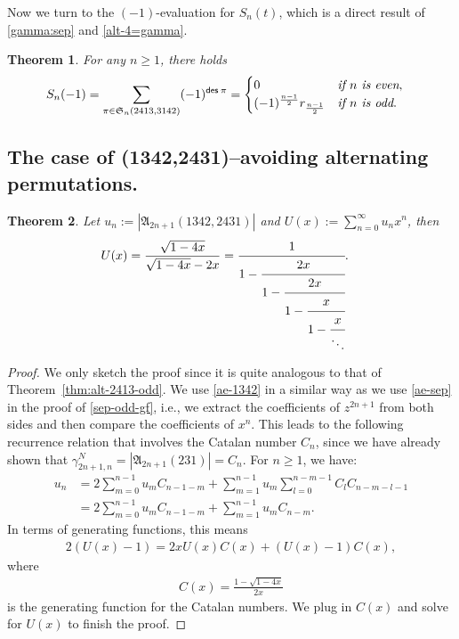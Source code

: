 \documentclass[12pt,reqno]{amsart}
\numberwithin{equation}{section}
\theoremstyle{plain}
\newtheorem{theorem}{Theorem}[section]
\theoremstyle{definition}
\def\S{\mathfrak{S}}
\def\A{\mathfrak{A}}
\def\des{\mathsf{des}}
\begin{document}
Now we turn to the $(-1)$-evaluation for $S_n(t)$, which is a direct result of \eqref{gamma:sep} and \eqref{alt-4=gamma}. 

\begin{theorem}\label{sep}
For any $n\ge 1$, there holds
\begin{align}
\label{alt:sep-odd}
S_{n}(-1)=\sum_{\pi\in\S_n(2413,3142)}(-1)^{\des\:\pi}&=\begin{cases}0 & \emph{if $n$ is even},\\
(-1)^{\frac{n-1}{2}}r_{\frac{n-1}{2}} & \emph{if $n$ is odd}.
\end{cases}




\end{align}
\end{theorem}




\subsection{The case of (1342,2431)--avoiding alternating permutations.}
\begin{theorem}\label{case1342-2431}
Let $u_{n}:=|\A_{2n+1}(1342,2431)|$ and  $U(x):=\sum\limits_{n=0}^{\infty}u_{n}x^n$, then
\begin{align}\label{1342-odd-gf}
U(x)&=\frac{\sqrt{1-4x}}{\sqrt{1-4x}-2x}=\cfrac{1}{1-\cfrac{2x}{1-\cfrac{2x}{1-\cfrac{x}{1-\cfrac{x}{\ddots}}}}}.
\end{align}
\end{theorem}
\begin{proof}
We only sketch the proof since it is quite analogous to that of Theorem~\ref{thm:alt-2413-odd}. We use \eqref{ae-1342} in a similar way as we use \eqref{ae-sep} in the proof of \eqref{sep-odd-gf}, i.e., we extract the coefficients of $z^{2n+1}$ from both sides and then compare the coefficients of $x^{n}$. This leads to the following recurrence relation that involves the Catalan number $C_n$, since we have already shown that $\gamma_{2n+1,n}^N=|\A_{2n+1}(231)|=C_n$. For $n\ge 1$, we have:
\begin{align*}
u_n&=2\sum_{m=0}^{n-1}u_mC_{n-1-m}+\sum_{m=1}^{n-1}u_m\sum_{l=0}^{n-m-1}C_lC_{n-m-l-1}\\
&=2\sum_{m=0}^{n-1}u_mC_{n-1-m}+\sum_{m=1}^{n-1}u_mC_{n-m}.
\end{align*}
In terms of generating functions, this means
\begin{align*}
2(U(x)-1)=2xU(x)C(x)+(U(x)-1)C(x),
\end{align*}
where
\begin{align*}
C(x)=\frac{1-\sqrt{1-4x}}{2x}
\end{align*}
is the generating function for the Catalan numbers. We plug in $C(x)$ and solve for $U(x)$ to finish the proof.
\end{proof}
\end{document}
